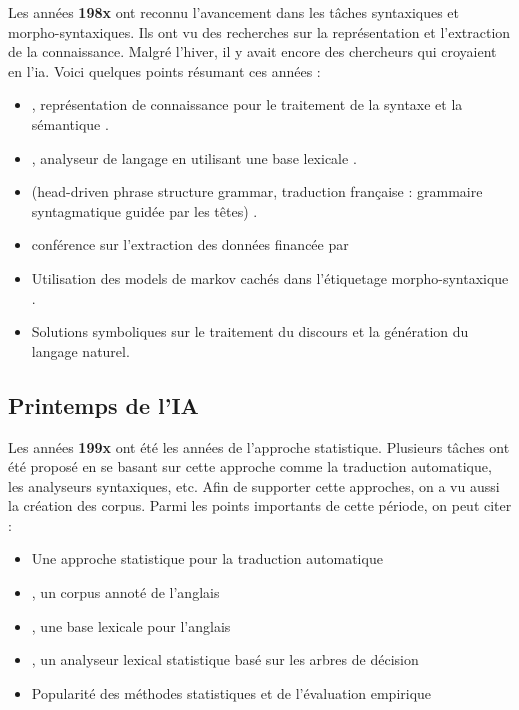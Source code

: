 \documentclass{KodeBook}
\begin{document}
Les années \textbf{198x} ont reconnu l'avancement dans les tâches syntaxiques et morpho-syntaxiques. 
Ils ont vu des recherches sur la représentation et l'extraction de la connaissance. 
Malgré l'hiver, il y avait encore des chercheurs qui croyaient en l'\ac{ia}. 
Voici quelques points résumant ces années :
\begin{itemize}
	\item {} , représentation de connaissance pour le traitement de la syntaxe et la sémantique \cite{1980-bobrow}.
	\item {} , analyseur de langage en utilisant une base lexicale \cite{1986-jacobs}.
	\item {}  (head-driven phrase structure grammar, traduction française : grammaire syntagmatique guidée par les têtes) \cite{1987-sag-pollard}.
	\item {}  conférence sur l'extraction des données financée par 
	\item {} Utilisation des models de markov cachés dans  l'étiquetage morpho-syntaxique \cite{1988-church}.
	\item Solutions symboliques sur le traitement du discours et la génération du langage naturel.
\end{itemize}

\subsection{Printemps de l'IA}

Les années \textbf{199x} ont été les années de l'approche statistique. 
Plusieurs tâches ont été proposé en se basant sur cette approche comme la traduction automatique, les analyseurs syntaxiques, etc. 
Afin de supporter cette approches, on a vu aussi la création des corpus. 
Parmi les points importants de cette période, on peut citer :
\begin{itemize}
	\item {} Une approche statistique pour la traduction automatique \cite{1990-brown-al}
	\item {} , un corpus annoté de l'anglais \cite{1993-marcus-al}
	\item {} , une base lexicale pour l'anglais \cite{1995-miller}
	\item {} , un analyseur lexical statistique basé sur les arbres de décision \cite{1996-magerman}
	\item Popularité des méthodes statistiques et de l'évaluation empirique
\end{itemize}
\end{document}

